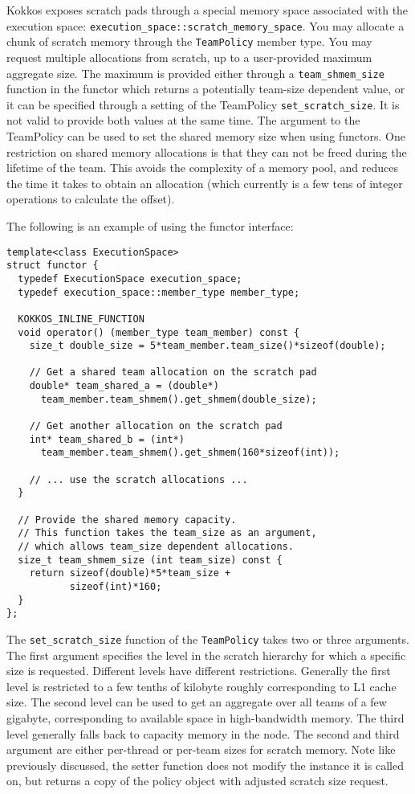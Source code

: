 Kokkos exposes scratch pads through a special memory space associated with the execution space:
\lstinline|execution_space::scratch_memory_space|.
You may allocate a chunk of scratch memory through the \lstinline|TeamPolicy| member type.
You may request multiple allocations from scratch, up to a user-provided maximum aggregate size. 
The maximum is provided either through a \lstinline|team_shmem_size| function in the functor which returns a potentially team-size dependent value, 
or it can be specified through a setting of the TeamPolicy \lstinline|set_scratch_size|. 
It is not valid to provide both values at the same time. 
The argument to the TeamPolicy can be used to set the shared memory size when using functors. 
One restriction on shared memory allocations is that they can not be freed during the lifetime of the team. 
This avoids the complexity of a memory pool,
and reduces the time it takes to obtain an allocation
(which currently is a few tens of integer operations to calculate the offset). 

The following is an example of using the functor interface:
\begin{lstlisting}
template<class ExecutionSpace>
struct functor {
  typedef ExecutionSpace execution_space;
  typedef execution_space::member_type member_type; 

  KOKKOS_INLINE_FUNCTION
  void operator() (member_type team_member) const {
    size_t double_size = 5*team_member.team_size()*sizeof(double);

    // Get a shared team allocation on the scratch pad
    double* team_shared_a = (double*)
      team_member.team_shmem().get_shmem(double_size);

    // Get another allocation on the scratch pad
    int* team_shared_b = (int*)
      team_member.team_shmem().get_shmem(160*sizeof(int));

    // ... use the scratch allocations ...
  }

  // Provide the shared memory capacity.
  // This function takes the team_size as an argument,
  // which allows team_size dependent allocations.
  size_t team_shmem_size (int team_size) const {
    return sizeof(double)*5*team_size +
           sizeof(int)*160;
  }
};
\end{lstlisting}

The \lstinline|set_scratch_size| function of the \lstinline|TeamPolicy| takes two or three arguments.
The first argument specifies the level in the scratch hierarchy for which a specific size is requested. 
Different levels have different restrictions. 
Generally the first level is restricted to a few tenths of kilobyte roughly corresponding to L1 cache size. 
The second level can be used to get an aggregate over all teams of a few gigabyte, corresponding to available 
space in high-bandwidth memory. 
The third level generally falls back to capacity memory in the node. 
The second and third argument are either per-thread or per-team sizes for scratch memory.
Note like previously discussed, the setter function does not modify the instance it is called on, but returns 
a copy of the policy object with adjusted scratch size request. 

